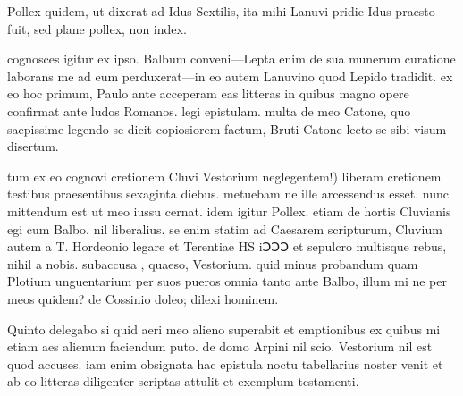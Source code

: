 


 Pollex quidem, ut dixerat ad Idus Sextilis, ita mihi Lanuvi pridie Idus praesto fuit, sed plane pollex, non index.

 cognosces igitur ex ipso. Balbum conveni—Lepta enim de sua munerum curatione laborans me ad eum perduxerat—in eo autem Lanuvino quod Lepido tradidit. ex eo hoc primum, Paulo ante acceperam eas litteras in quibus magno opere confirmat ante ludos Romanos. legi epistulam. multa de meo Catone, quo saepissime legendo se dicit copiosiorem factum, Bruti Catone lecto se sibi visum disertum.

 tum ex eo cognovi cretionem Cluvi Vestorium neglegentem!) liberam cretionem testibus praesentibus sexaginta diebus. metuebam ne ille arcessendus esset. nunc mittendum est ut meo iussu cernat. idem igitur Pollex. etiam de hortis Cluvianis egi cum Balbo. nil liberalius. se enim statim ad Caesarem scripturum, Cluvium autem a T. Hordeonio legare et Terentiae HS iↃↃↃ et sepulcro multisque rebus, nihil a nobis. subaccusa , quaeso, Vestorium. quid minus probandum quam Plotium unguentarium per suos pueros omnia tanto ante Balbo, illum mi ne per meos quidem? de Cossinio doleo; dilexi hominem.

 Quinto delegabo si quid aeri meo alieno superabit et emptionibus ex quibus mi etiam aes alienum faciendum puto. de domo Arpini nil scio. Vestorium nil est quod accuses. iam enim obsignata hac epistula noctu tabellarius noster venit et ab eo litteras diligenter scriptas attulit et exemplum testamenti.
